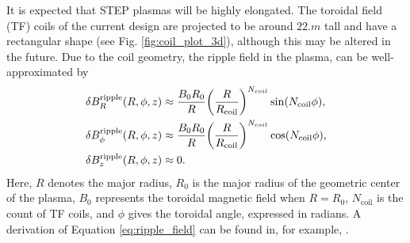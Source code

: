\documentclass[10pt, a4paper, twoside]{article}
\begin{document}
It is expected that STEP plasmas will be highly elongated. The toroidal field (TF) coils of the current design are projected to be around $\si{22.m}$ tall and have a rectangular shape (see Fig. \ref{fig:coil_plot_3d}), although this may be altered in the future. Due to the coil geometry, the ripple field in the plasma, can be well-approximated by
\begin{equation}
    \label{eq:ripple_field}
    \begin{aligned}
        \delta B_R^{\text{ripple}}(R, \phi, z) &\approx \frac{B_0 R_0}{R} \qty(\frac{R}{R_{\text{coil}}})^{N_{coil}}\sin(N_{\text{coil}}\phi), \\
        \delta B_\phi^{\text{ripple}}(R, \phi, z) &\approx \frac{B_0 R_0}{R} \qty(\frac{R}{R_{\text{coil}}})^{N_{coil}}\cos(N_{\text{coil}}\phi),\\
        \delta B_z^{\text{ripple}}(R, \phi, z) &\approx 0.
    \end{aligned}
\end{equation}
Here, $R$ denotes the major radius, $R_0$ is the major radius of the geometric center of the plasma, $B_0$ represents the toroidal magnetic field when $R=R_0$, $N_{\text{coil}}$ is the count of TF coils, and $\phi$ gives the toroidal angle, expressed in radians. A derivation of Equation \eqref{eq:ripple_field} can be found in, for example, \cite{mcclements2005}.
\end{document}
